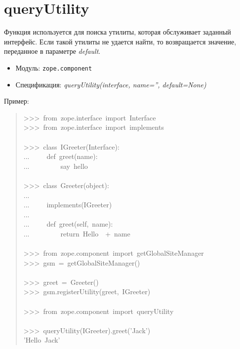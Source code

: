 \documentclass[a4paper,openany,twoside,final]{book}
\providecommand*{\DUroletitlereference}[1]{\textsl{#1}}
\begin{document}
\section*{queryUtility%
  \label{queryutility}%
}

Функция используется для поиска утилиты, которая обслуживает заданный
интерфейс.  Если такой утилиты не удается найти, то возвращается
значение, переданное в параметре \DUroletitlereference{default}.

\begin{itemize}

\item Модуль: \texttt{zope.component}

\item Спецификация: \DUroletitlereference{queryUtility(interface, name='', default=None)}

\end{itemize}

Пример:

\begin{quote}{\ttfamily \raggedright \noindent
>{}>{}>~from~zope.interface~import~Interface\\
>{}>{}>~from~zope.interface~import~implements\\
~\\
>{}>{}>~class~IGreeter(Interface):\\
...~~~~~def~greet(name):\\
...~~~~~~~~~\textquotedbl{}say~hello\textquotedbl{}\\
~\\
>{}>{}>~class~Greeter(object):\\
...\\
...~~~~~implements(IGreeter)\\
...\\
...~~~~~def~greet(self,~name):\\
...~~~~~~~~~return~\textquotedbl{}Hello~\textquotedbl{}~+~name\\
~\\
>{}>{}>~from~zope.component~import~getGlobalSiteManager\\
>{}>{}>~gsm~=~getGlobalSiteManager()\\
~\\
>{}>{}>~greet~=~Greeter()\\
>{}>{}>~gsm.registerUtility(greet,~IGreeter)\\
~\\
>{}>{}>~from~zope.component~import~queryUtility\\
~\\
>{}>{}>~queryUtility(IGreeter).greet('Jack')\\
'Hello~Jack'
}
\end{quote}
\end{document}
